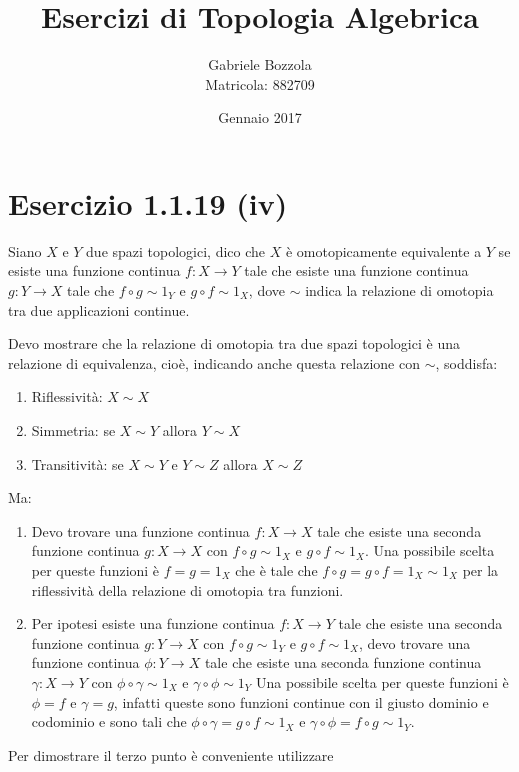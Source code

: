 \documentclass[10pt]{scrartcl}
\title{Esercizi di Topologia Algebrica}
\author{Gabriele Bozzola \\ Matricola: 882709}
\date{Gennaio 2017}
\begin{document}
\maketitle

\section*{Esercizio 1.1.19 (iv)}
Siano $ X $ e $ Y $ due spazi topologici, dico che $ X $ è
omotopicamente equivalente a $ Y $ se esiste una funzione
continua $ f \colon X \to Y $ tale che esiste una funzione
continua $ g \colon Y \to X $ tale che $ f \circ g \sim 1_{Y} $ e
$ g \circ f \sim 1_{X} $, dove $ \sim $ indica la relazione di
omotopia tra due applicazioni continue.

Devo mostrare che la relazione di omotopia tra due spazi
topologici è una relazione di equivalenza,
cioè, indicando anche questa relazione con $ \sim $, soddisfa:
\begin{enumerate}
\item Riflessività: $ X \sim X $
\item Simmetria: se $ X \sim Y $ allora $ Y \sim X $
\item Transitività: se $ X \sim Y $ e $ Y \sim Z $ allora $ X \sim Z $
\end{enumerate}
Ma:
\begin{enumerate}
\item Devo trovare una funzione continua $ f \colon X \to X $
  tale che esiste una seconda funzione continua $ g \colon X \to X $
  con $ f \circ g \sim 1_X $ e $ g \circ f \sim 1_X $.
  Una possibile scelta per queste funzioni è $ f = g = 1_X $
  che è tale che $ f \circ g = g \circ f = 1_X \sim 1_X $ per la
  riflessività della relazione di omotopia tra funzioni.
\item Per ipotesi esiste una funzione continua $ f \colon X \to Y $
  tale che esiste una seconda funzione continua $ g \colon Y \to X $
  con $ f \circ g \sim 1_Y $ e $ g \circ f \sim 1_X $, devo trovare
  una funzione continua $ \phi \colon Y \to X $ tale che esiste una
  seconda funzione continua $ \gamma \colon X \to Y $
  con $ \phi \circ \gamma \sim 1_X $ e $ \gamma \circ \phi \sim 1_Y $
  Una possibile scelta per queste funzioni è $ \phi = f $
  e $ \gamma = g $, infatti queste sono funzioni continue
  con il giusto dominio e codominio e sono tali che
  $ \phi \circ \gamma = g \circ f \sim 1_{X} $ e $ \gamma \circ \phi = f \circ g \sim 1_{Y} $.
\end{enumerate}
Per dimostrare il terzo punto è conveniente utilizzare
\end{document}
